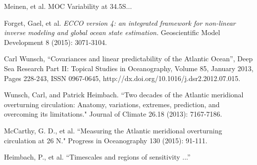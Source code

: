 \documentclass[a4paper,11pt]{article}
\begin{document}
\begin{thebibliography}{3}

  Meinen, et al. MOC Variability at 34.5S...
  
  Forget, Gael, et al. \textit{ECCO version 4: an integrated framework for non-linear inverse modeling and global ocean state estimation.} Geoscientific Model Development 8 (2015): 3071-3104.
  
  Carl Wunsch, ``Covariances and linear predictability of the Atlantic Ocean'', Deep Sea Research Part II: Topical Studies in Oceanography, Volume 85, January 2013, Pages 228-243, ISSN 0967-0645, http://dx.doi.org/10.1016/j.dsr2.2012.07.015.
  
  Wunsch, Carl, and Patrick Heimbach. ``Two decades of the Atlantic meridional overturning circulation: Anatomy, variations, extremes, prediction, and overcoming its limitations." Journal of Climate 26.18 (2013): 7167-7186.
  
  McCarthy, G. D., et al. ``Measuring the Atlantic meridional overturning circulation at 26 N." Progress in Oceanography 130 (2015): 91-111.

  Heimbach, P., et al. ``Timescales and regions of sensitivity ...''

\end{thebibliography}
\end{document}
